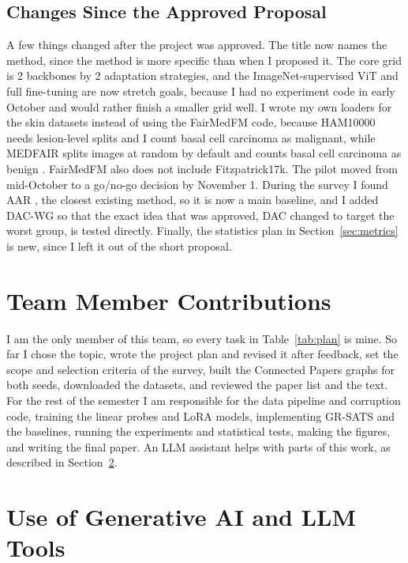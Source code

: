 \documentclass[sigconf,nonacm]{acmart}
\begin{document}
\subsection{Changes Since the Approved Proposal}

A few things changed after the project was approved. The title now names the method, since the method is more specific than when I proposed it. The core grid is 2 backbones by 2 adaptation strategies, and the ImageNet-supervised ViT and full fine-tuning are now stretch goals, because I had no experiment code in early October and would rather finish a smaller grid well. I wrote my own loaders for the skin datasets instead of using the FairMedFM code, because HAM10000 needs lesion-level splits and I count basal cell carcinoma as malignant, while MEDFAIR splits images at random by default and counts basal cell carcinoma as benign \cite{zong2023medfair}. FairMedFM also does not include Fitzpatrick17k. The pilot moved from mid-October to a go/no-go decision by November 1. During the survey I found AAR \cite{yuksekgonul2023atypicality}, the closest existing method, so it is now a main baseline, and I added DAC-WG so that the exact idea that was approved, DAC changed to target the worst group, is tested directly. Finally, the statistics plan in Section~\ref{sec:metrics} is new, since I left it out of the short proposal.

\section{Team Member Contributions}

I am the only member of this team, so every task in Table~\ref{tab:plan} is mine. So far I chose the topic, wrote the project plan and revised it after feedback, set the scope and selection criteria of the survey, built the Connected Papers graphs for both seeds, downloaded the datasets, and reviewed the paper list and the text. For the rest of the semester I am responsible for the data pipeline and corruption code, training the linear probes and LoRA models, implementing GR-SATS and the baselines, running the experiments and statistical tests, making the figures, and writing the final paper. An LLM assistant helps with parts of this work, as described in Section~\ref{sec:llm}.

\section{Use of Generative AI and LLM Tools}
\label{sec:llm}
\end{document}
